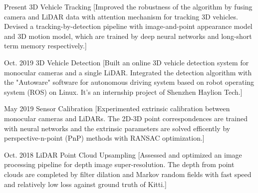 \documentclass{resume}
\begin{document}
\begin{experiences}
  \experience%
    {Present}%
    {3D Vehicle Tracking}%
    [Improved the robustness of the algorithm by fusing camera and LiDAR data with attention mechanism for tracking 3D vehicles. Devised a tracking-by-detection pipeline with image-and-point appearance model and 3D motion model, which are trained by deep neural networks and long-short term memory respectively.]

\separator{0.5ex}

  \experience%
    {Oct. 2019}%
    {3D Vehicle Detection}%
    [Built an online 3D vehicle detection system for monocular cameras and a single LiDAR. Integrated the detection algorithm with the "Autoware" software for autonomous driving system based on robot operating system (ROS) on Linux. It's an internship project of Shenzhen Haylion Tech.] 

\separator{0.5ex}

  \experience%
    {May 2019}%
    {Sensor Calibration}%
    [Experimented extrinsic calibration between monocular cameras and LiDARs. The 2D-3D point correspondences are trained with neural networks and the extrinsic parameters are solved efficently by perspective-n-point (PnP) methods with RANSAC optimization.]

\separator{0.5ex}

  \experience%
    {Oct. 2018}%
    {LiDAR Point Cloud Upsampling}%
    [Assessed and optimized an image processing pipeline for depth image super-resolution. The depth from point clouds are completed by filter dilation and Markov random fields with fast speed and relatively low loss against ground truth of Kitti.]   
    

\end{experiences}

\begin{competences}[12em]
\end{competences}
\end{document}
